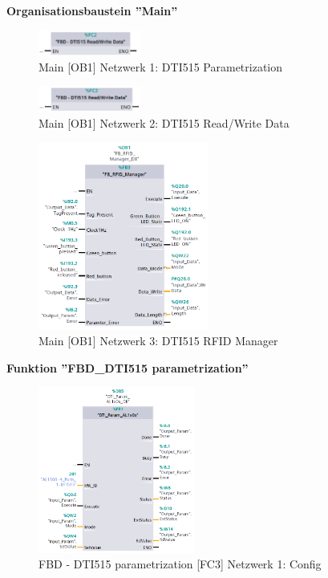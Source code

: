 \textbf{\LARGE Organisationsbaustein ''Main''}
\begin{figure}[h!]
	\centering
	\includegraphics[width=0.3\textwidth]{images/MainNetzwerk1.png}
	\caption{Main [OB1] Netzwerk 1: DTI515 Parametrization}
	\label{fig:Main[OB1]Netzwerk1}
\end{figure}
\begin{figure}[h!]
	\centering
	\includegraphics[width=0.3\textwidth]{images/MainNetzwerk2.png}
	\caption{Main [OB1] Netzwerk 2: DTI515 Read/Write Data}
	\label{fig:Main[OB1]Netzwerk2}
\end{figure}
\begin{figure}[h!]
	\centering
	\includegraphics[width=0.5\textwidth]{images/MainNetzwerk3.png}
	\caption{Main [OB1] Netzwerk 3: DTI515 RFID Manager}
	\label{fig:Main[OB1]Netzwerk3}
\end{figure}
\newpage
\textbf{\LARGE Funktion ''FBD\_DTI515 parametrization''}
\begin{figure}[h!]
	\centering
	\includegraphics[width=0.46\textwidth]{images/DTI515parametrizationNetzwerk1.png}
	\caption{FBD - DTI515 parametrization [FC3] Netzwerk 1: Config}
	\label{fig:DTI515parametrization[FC3]Netzwerk1}
\end{figure}


